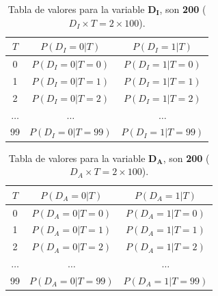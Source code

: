 \documentclass[12pt]{article}
\begin{document}
\begin{table}[h!]
	\centering
	\begin{tabular}{|c|c|c|}
		\hline
		\rowcolor[gray]{.8}
		$T$&$P(D_I=0|T)$&$P(D_I=1|T)$ \\\hline %
		0 & $P(D_I=0|T=0)$ &$P(D_I=1|T=0)$\\\hline
		1 & $P(D_I=0|T=1)$ &$P(D_I=1|T=1)$\\\hline
		2 & $P(D_I=0|T=2)$ &$P(D_I=1|T=2)$\\\hline
		$\dots$ & $\dots$ &$\dots$\\\hline
		99 & $P(D_I=0|T=99)$ &$P(D_I=1|T=99)$\\\hline
	\end{tabular}
	\caption{Tabla de valores para la variable $\pmb{D_I}$, son \textbf{200} ($D_I\times T=2\times 100$).}
	\label{tab:ej1002}
\end{table}
\begin{table}[h!]
	\centering
	\begin{tabular}{|c|c|c|}
		\hline
		\rowcolor[gray]{.8}
		$T$&$P(D_A=0|T)$&$P(D_A=1|T)$ \\\hline %
		0 & $P(D_A=0|T=0)$ &$P(D_A=1|T=0)$\\\hline
		1 & $P(D_A=0|T=1)$ &$P(D_A=1|T=1)$\\\hline
		2 & $P(D_A=0|T=2)$ &$P(D_A=1|T=2)$\\\hline
		$\dots$ & $\dots$ &$\dots$\\\hline
		99 & $P(D_A=0|T=99)$ &$P(D_A=1|T=99)$\\\hline
	\end{tabular}
	\caption{Tabla de valores para la variable $\pmb{D_A}$, son \textbf{200} ($D_A\times T=2\times 100$).}
	\label{tab:ej1003}
\end{table}
\end{document}
